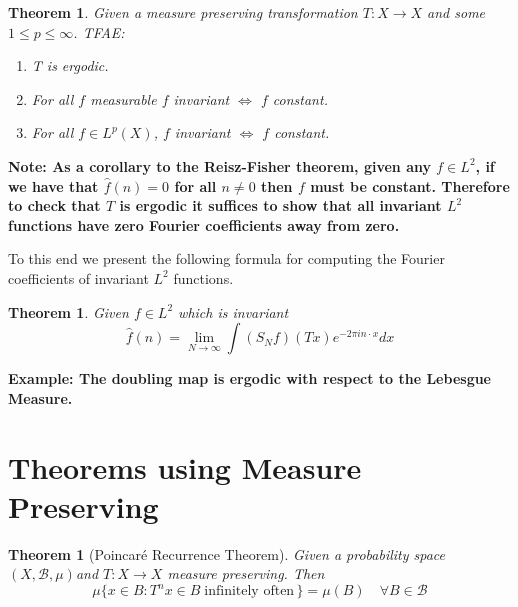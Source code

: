\documentclass[11pt]{article}
\newcommand{\msrspc}{\ensuremath{(X,\mathcal{B},\mu)}}
\newenvironment{note}
	{\begin{mdframed}[backgroundcolor=white, linecolor=red, roundcorner=5pt, linewidth=1pt]\bfseries{Note:}\normalfont}
	{\end{mdframed}}
\newenvironment{eg}
	{\begin{mdframed}[backgroundcolor=mylg,roundcorner=5pt,linewidth=0pt]\bfseries{Example:}\normalfont}
	{\end{mdframed}}
\newtheorem{theorem}[prop]{Theorem}
\begin{document}
\begin{theorem}
Given a measure preserving transformation $T:X\to X$ and some $1\leq p\leq\infty$. TFAE:
\begin{enumerate}
	\item T is ergodic.
	\item For all $f$ measurable $f$ invariant $\iff$ $f$ constant.
	\item For all $f\in L^p(X)$, $f$ invariant $\iff$ $f$ constant.
\end{enumerate}
\end{theorem}
\begin{note}
	As a corollary to the Reisz-Fisher theorem, given any $f\in L^2$, if we have that $\hat{f}(n)=0$ for all $n\neq 0$ then $f$ must be constant.
Therefore to check that $T$ is ergodic it suffices to show that all invariant $L^2$ functions have zero Fourier coefficients away from zero.
\end{note}
To this end we present the following formula for computing the Fourier coefficients of invariant $L^2$ functions.
\begin{theorem}
Given $f\in L^2$ which is invariant
$$\hat{f}(n)=\lim_{N\to\infty}\int (S_Nf)(Tx)e^{-2\pi i n\cdot x}dx$$
\end{theorem}

\begin{eg}
	\textbf{The doubling map is ergodic with respect to the Lebesgue Measure.}
\end{eg}

\section{Theorems using Measure Preserving}
\begin{theorem}[Poincar\'e Recurrence Theorem]
	Given a probability space \msrspc and $T:X\to X$ measure preserving. Then
	$$\mu\{x\in B : T^nx\in B \; \text{infinitely often}\,\}=\mu(B)\quad \forall B\in\mathcal{B}$$
\end{theorem}
\end{document}

